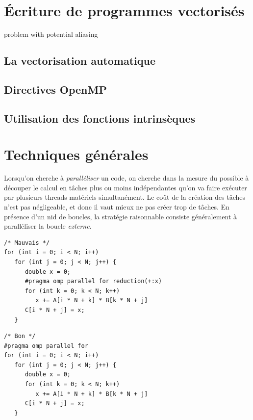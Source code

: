 \section{Écriture de programmes vectorisés}

problem with potential aliasing

\subsection{La vectorisation automatique}

\subsection{Directives OpenMP}

\subsection{Utilisation des fonctions \og intrinsèques\fg}


\section{Techniques générales}

Lorsqu'on cherche à \emph{paralléliser} un code, on cherche dans la mesure du
possible à découper le calcul en tâches plus ou moins indépendantes qu'on va
faire exécuter par plusieurs threads matériels simultanément. Le coût de la
création des tâches n'est pas négligeable, et donc il vaut mieux ne pas créer
trop de tâches. En présence d'un nid de boucles, la stratégie raisonnable
consiste généralement à paralléliser la boucle \emph{externe}.

\medskip

\begin{minipage}{0.55\textwidth}
\begin{verbatim}
/* Mauvais */
for (int i = 0; i < N; i++)
   for (int j = 0; j < N; j++) {
      double x = 0;
      #pragma omp parallel for reduction(+:x)
      for (int k = 0; k < N; k++)
         x += A[i * N + k] * B[k * N + j]
      C[i * N + j] = x;
   }
\end{verbatim}
\end{minipage}%
\begin{minipage}{0.45\textwidth}
\begin{verbatim}
/* Bon */
#pragma omp parallel for
for (int i = 0; i < N; i++)
   for (int j = 0; j < N; j++) {
      double x = 0;
      for (int k = 0; k < N; k++)
         x += A[i * N + k] * B[k * N + j]
      C[i * N + j] = x;
   }
\end{verbatim}
\end{minipage}

